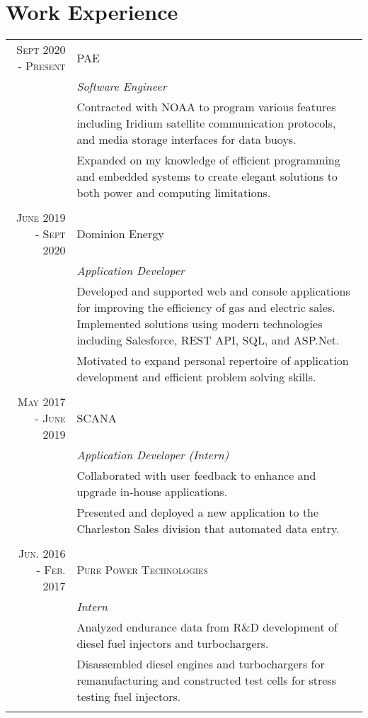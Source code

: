 \documentclass[a4paper,10pt]{article}
\begin{document}
\section{Work Experience}
\begin{tabular}{r|p{11cm}}
 \textsc{Sept 2020 - Present} & PAE
 \\&\emph{Software Engineer}\\
 &\footnotesize{Contracted with NOAA to program various features including Iridium satellite communication protocols, and media storage interfaces for data buoys.} \\ & \footnotesize{Expanded on my knowledge of efficient programming and embedded systems to create elegant solutions to both power and computing limitations.
 }\\\multicolumn{2}{c}{} \\

 \textsc{June 2019 - Sept 2020} & Dominion Energy
 \\&\emph{Application Developer}\\
 &\footnotesize{Developed and supported web and console applications for improving the efficiency of gas and electric sales.  
Implemented solutions using modern technologies including Salesforce, REST API, SQL, and ASP.Net.} \\ & \footnotesize{Motivated to expand personal repertoire of application development and efficient problem solving skills.
 }\\\multicolumn{2}{c}{} \\

 \textsc{May 2017 - June 2019} & SCANA
 \\&\emph{Application Developer (Intern)}\\
 &\footnotesize{Collaborated with user feedback to enhance and upgrade in-house applications.} \\& \footnotesize{Presented and deployed a new application to the Charleston Sales division that automated data entry.
 }\\\multicolumn{2}{c}{} \\
 

 \textsc{Jun. 2016 - Feb. 2017} & \textsc{Pure Power Technologies} 
 \\&\emph{Intern}\\&\footnotesize{Analyzed endurance data from R\&D development of diesel fuel injectors and turbochargers.} \\& \footnotesize{ 
Disassembled diesel engines and turbochargers for remanufacturing and constructed test cells for stress testing fuel injectors. 
}\\\multicolumn{2}{c}{} 
\end{tabular}
\end{document}

